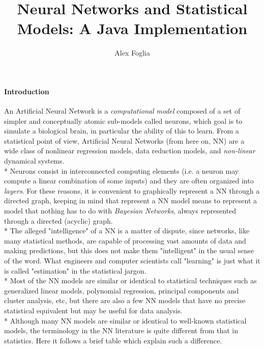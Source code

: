 \documentclass[10pt,a4paper]{article}
\author{Alex Foglia}
\title{Neural Networks and Statistical Models: A Java Implementation}
\date{}
\begin{document}
	\maketitle
	\paragraph{Introduction}
	An Artificial Neural Network is a \emph{computational model} composed of a set of simpler and conceptually atomic sub-models called neurons, which goal is to simulate a biological brain, in particular the ability of this to learn. From a statistical point of view, Artificial Neural Networks (from here on, NN) are a wide class of nonlinear regression models, data reduction models, and \emph{non-linear} dynamical systems.\\*
	Neurons consist in interconnected computing elements (i.e. a neuron may compute a linear combination of some inputs) and they are often organized into \emph{layers}. For these reasons, it is convenient to graphically represent a NN through a directed graph, keeping in mind that represent a NN model means to represent a model that nothing has to do with \emph{Bayesian Networks}, always represented through a directed (acyclic) graph.\\*
	The alleged "intelligence" of a NN is a matter of dispute, since networks, like many statistical methods, are capable of processing vast amounts of data and making predictions, but this does not make them "intelligent" in the usual sense of the word. What engineers and computer scientists call "learning" is just what it is called "estimation" in the statistical jargon.\\*
	Most of the NN models are similar or identical to statistical techniques such as generalized linear models, polynomial regression, principal components and cluster analysis, etc, but there are also a few NN models that have no precise statistical equivalent but may be useful for data analysis.\\*
	Although many NN models are similar or identical to well-known statistical models, the terminology in the NN literature is quite different from that in statistics. Here it follows a brief table which explain such a difference.
\end{document}
